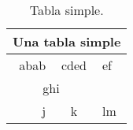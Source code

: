 \documentclass[10pt,a4paper]{article}
\theoremstyle{definition}
\begin{document}
\begin{table}[H]
	\centering
	\begin{tabular}{|r|c|l|}
		\hline
		\multicolumn{3}{|c|}{Una tabla simple}	\\
		\hline
		abab & cded & ef 						\\
		\cline{1-2}
		\multicolumn{2}{|c|}{ghi} & 			\\
		\hline
		j & k & lm								\\
		\hline
	\end{tabular}
	\caption[Primera tabla]{Tabla simple.}
\end{table}

\nocite{*}


\end{document}
